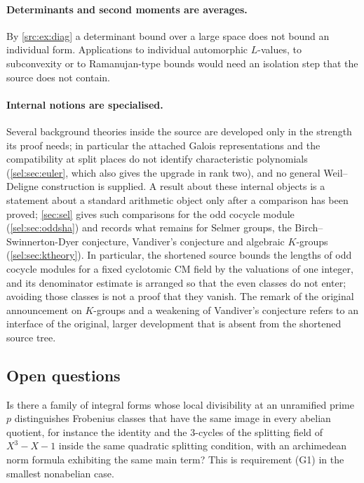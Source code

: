 \paragraph{Determinants and second moments are averages.}
By \cref{src:ex:diag} a determinant bound over a large space does not bound an individual
form. Applications to individual automorphic $L$-values, to subconvexity or to
Ramanujan-type bounds would need an isolation step that the source does not contain.

\paragraph{Internal notions are specialised.}
Several background theories inside the source are developed only in the strength its proof
needs; in particular the attached Galois representations and the compatibility at split places
do not identify characteristic polynomials (\cref{sel:sec:euler}, which also gives the upgrade
in rank two), and no general Weil--Deligne construction is supplied. A result about these
internal objects is a statement about a standard arithmetic object only after a comparison has
been proved; \cref{sec:sel} gives such comparisons for the odd cocycle module
(\cref{sel:sec:oddsha}) and records what remains for Selmer groups, the Birch--Swinnerton-Dyer
conjecture, Vandiver's conjecture and algebraic $K$-groups (\cref{sel:sec:ktheory}). In
particular, the shortened source bounds the lengths of odd cocycle modules for a fixed
cyclotomic CM field by the valuations of one integer, and its denominator estimate is arranged
so that the even classes do not enter; avoiding those classes is not a proof that they vanish. The remark of the original announcement on $K$-groups and a weakening of
Vandiver's conjecture \cite[Step~17]{Alpoge2026Remark} refers to an interface of the original,
larger development that is absent from the shortened source tree.

\subsection{Open questions}\label{src:sec:open}
\begingroup\raggedright
{}
\endgroup

\begin{question}\label{src:q:divisibility}
Is there a family of integral forms whose local divisibility at an unramified prime $p$
distinguishes Frobenius classes that have the same image in every abelian quotient, for
instance the identity and the $3$-cycles of the splitting field of $X^3-X-1$ inside the same
quadratic splitting condition, with an archimedean norm formula exhibiting the same main term?
This is requirement (G1) in the smallest nonabelian case.
\end{question}

